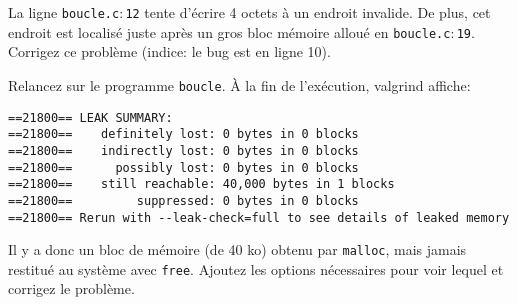\documentclass[10pt]{article}\usepackage[nu]{esial}
\begin{document}
\begin{Exercice}
  La ligne \texttt{boucle.c$:$12} tente d'écrire 4 octets à un endroit
  invalide. De plus, cet endroit est localisé juste après un gros bloc mémoire
  alloué en \texttt{boucle.c$:$19}. Corrigez ce problème (indice: le bug est en
  ligne 10).

  \Question Relancez  sur le programme \texttt{boucle}.  À la fin
  de l'exécution, valgrind affiche:
  \begin{Verbatim}
==21800== LEAK SUMMARY:
==21800==    definitely lost: 0 bytes in 0 blocks
==21800==    indirectly lost: 0 bytes in 0 blocks
==21800==      possibly lost: 0 bytes in 0 blocks
==21800==    still reachable: 40,000 bytes in 1 blocks
==21800==         suppressed: 0 bytes in 0 blocks
==21800== Rerun with --leak-check=full to see details of leaked memory
  \end{Verbatim}
  
  Il y a donc un bloc de mémoire (de 40 ko) obtenu par \texttt{malloc},
  mais jamais restitué au système avec \texttt{free}. Ajoutez les options
  nécessaires pour voir lequel et corrigez le problème.
\end{Exercice}
\end{document}
